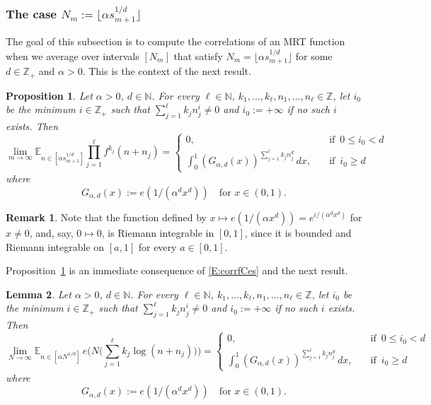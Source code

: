 \documentclass[11pt]{amsart}
\newtheorem{lemma}{Lemma}[section]
\newtheorem{proposition}[lemma]{Proposition}
\theoremstyle{definition}
\newtheorem*{remark}{Remark}
\newcommand{\E}{{\mathbb E}}
\newcommand{\N}{{\mathbb N}}
\newcommand{\Z}{{\mathbb Z}}
\begin{document}
 	\subsubsection{The case  $N_m:=\lfloor\alpha s_{m+1}^{1/d}\rfloor$}
 	The goal of this subsection is to compute the correlations of an MRT function when
 	we average over intervals     $[N_m]$ that satisfy   $N_m=\lfloor\alpha s_{m+1}^{1/d}\rfloor$  for some $d\in \Z_+$ and $\alpha>0$. This is the context of the next result.
 		\begin{proposition}\label{P:corrlog}
 		Let $\alpha>0$, $d\in \N$.
 		For every $\ell\in\N$, $k_1,\ldots, k_\ell, n_1,\ldots, n_\ell \in \Z$,
 		let  $i_0$ be the minimum $i\in \Z_+$
 		such that $\sum_{j=1}^\ell k_j n_j^i\neq  0$ and $i_0:=+\infty$ if no such   $i$ exists.
 		Then 	
 		$$
 			\lim_{m\to \infty}	\E_{n\in[\alpha s_{m+1}^{1/d}]}\prod_{j=1}^\ell f^{k_j}(n+n_j)=
 		\begin{cases}
 			0, & \quad \text{if }\,  0\leq i_0< d\\
 			\int_0^1 (G_{\alpha,d}(x))^{\sum_{j=1}^\ell k_jn_j^d} \, dx, & \quad \text{if } \, i_0\geq d
 		\end{cases}
 		$$
 		where
 		$$
 		G_{\alpha,d}(x):=e(1/(\alpha^d x^d)) \quad  \text{for } x\in (0,1).
 		$$
 	\end{proposition}
 	\begin{remark}
 	Note that the function defined by $x\mapsto e(1/(\alpha x^d))=e^{i /(\alpha^d x^d)}$ for $x\neq0$, and, say, $0\mapsto 0$, is Riemann integrable in $[0,1]$, since it is bounded and Riemann integrable on $[a,1]$ for every $a\in [0,1]$.
 \end{remark}
 	Proposition~\ref{P:corrlog} is an immediate consequence of \eqref{E:corrfCes} and the next result.
 		\begin{lemma}\label{L:corrlog}
   Let $\alpha>0$, $d\in \N$.
 For every $\ell\in\N$, $k_1,\ldots, k_\ell, n_1,\ldots, n_\ell \in \Z$,
 let  $i_0$ be the minimum $i\in \Z_+$
 such that $\sum_{j=1}^\ell k_j n_j^i\neq  0$ and $i_0:=+\infty$ if no such   $i$ exists.
 Then 	
 $$
 	\lim_{N\to \infty} 	\E_{n\in[\alpha N^{1/d}]}\, e\big(N\big(\sum_{j=1}^\ell k_j \log(n+n_j)\big)\big)=
 \begin{cases}
 	0, & \quad \text{if }\,  0\leq i_0< d\\
 	\int_0^1 (G_{\alpha,d}(x))^{\sum_{j=1}^\ell k_jn_j^d} \, dx, & \quad \text{if } \, i_0\geq d
 \end{cases}
 $$
 where
 $$
 G_{\alpha,d}(x):=e(1/(\alpha^d x^d)) \quad  \text{for } x\in (0,1).
 $$
 	\end{lemma}
\end{document}
